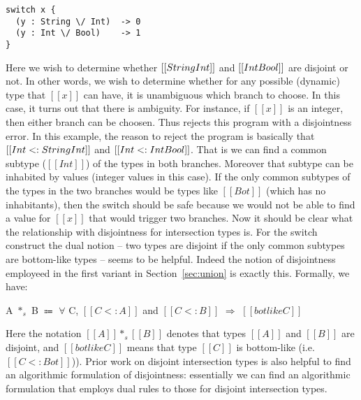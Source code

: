 \begin{lstlisting}
switch x {
  (y : String \/ Int)  -> 0
  (y : Int \/ Bool)    -> 1
}
\end{lstlisting}

\noindent Here we wish to determine whether $[[String \/ Int]]$ and $[[Int \/ Bool]]$
are disjoint or not. In other words, we wish to determine whether for any possible
(dynamic) type that $[[x]]$ can have, it is unambiguous which branch to choose.
In this case, it turns out that there is ambiguity. For instance, if $[[x]]$ is an integer,
then either branch can be choosen. Thus \cal rejects this program with a disjointness error.
In this example, the reason to reject the program is basically that $[[Int <: String \/ Int]]$
and $[[Int <: Int \/ Bool]]$. That is we can find a common subtype ($[[Int]]$) of the
types in both branches. Moreover that subtype can be inhabited by values (integer values
in this case). If the only common subtypes of the types in the two branches
would be types like $[[Bot]]$ (which has no inhabitants), then the switch should
be safe because we would not be able to find a value for $[[x]]$ that would trigger
two branches. Now it should be clear what the relationship with disjointness for intersection
types is. For the switch construct the dual notion -- two types are disjoint if the only
common subtypes are bottom-like types -- seems to be helpful.
Indeed the notion of disjointness employeed in the first variant \cal in Section~\ref{sec:union}
is exactly this. Formally, we have:

\begin{definition}\label{def:disjointness}
	A $*_s$ B $\Coloneqq$ $\forall$ C, $[[C <: A]]$ and $[[C <: B]]$ $\Longrightarrow$ $[[botlike C]]$
\end{definition}

\noindent Here the notation $[[A]] *_s [[B]]$ denotes that types $[[A]]$ and $[[B]]$ are disjoint,
and $[[botlike C]]$ means that type $[[C]]$ is bottom-like (i.e. $[[C <: Bot]]$)).
Prior work on disjoint intersection types is also helpful
to find an algorithmic formulation of disjointness: essentially we can find an algorithmic
formulation that employs dual rules to those for disjoint intersection types.

